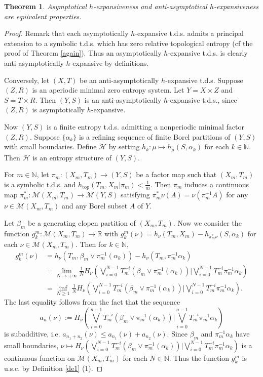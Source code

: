 \documentclass[12pt]{amsart}
\newtheorem{thm}{Theorem}[section]
\theoremstyle{definition} \theoremstyle{question}
\numberwithin{equation}{section}
\begin{document}
\begin{thm} \label{qahe}
Asymptotical $h$-expansiveness and anti-asymptotical $h$-expansiveness
are equivalent properties.
\end{thm}
\begin{proof}
Remark that each asymptotically
$h$-expansive t.d.s. admits a principal extension to a symbolic t.d.s. which has zero relative topological entropy (cf the proof of Theorem \ref{again}).
Thus
an asymptotically $h$-expansive
t.d.s. is clearly anti-asymptotically $h$-expansive by definitions.

Conversely, let $(X, T)$ be an anti-asymptotically $h$-expansive
t.d.s. Suppose $(Z,R)$ is an aperiodic minimal zero entropy system.
Let $Y=X\times Z$ and $S=T\times R$. Then $(Y,S)$ is an
anti-asymptotically $h$-expansive t.d.s., since $(Z,R)$ is
asymptotically $h$-expansive.

Now $(Y,S)$ is a finite entropy t.d.s. admitting a nonperiodic
minimal factor $(Z,R)$. Suppose $\{\alpha_k\}$ is a refining sequence of
finite Borel partitions of $(Y,S)$ with small boundaries. Define
$\mathcal{H}$ by setting $h_k :\mu\mapsto h_\mu(S,\alpha_k)$ for each $k\in {\mathbb N}$. Then
$\mathcal{H}$ is an entropy structure of $(Y,S)$.

For $m\in \mathbb{N}$, let $\pi_m: (X_m,T_m)\rightarrow (Y,S)$ be a
factor map such that $(X_m,T_m)$ is a symbolic t.d.s. and
$h_{\text{top}}(T_m, X_m|\pi_m)<\frac{1}{m}$. Then $\pi_m$ induces a
continuous map $\pi_m^*:\mathcal{M}(X_m,T_m)\rightarrow
\mathcal{M}(Y,S)$ satisfying $\pi_m^*\nu(A)=\nu(\pi^{-1}_mA)$ for
any $\nu\in \mathcal{M}(X_m,T_m)$ and  any Borel subset $A$ of $Y$.

Let $\beta_m$ be a generating clopen partition of $(X_m,T_m)$. Now
we consider the function $g^{m}_k:\mathcal{M}(X_m,T_m)\rightarrow
\mathbb{R}$ with
$g^m_{k}(\nu)=h_\nu(T_m,X_m)-h_{\pi_m^*\nu}(S,\alpha_k)$ for each $\nu\in
\mathcal{M}(X_m,T_m)$. Then for $k\in \mathbb{N}$,
\begin{align*}
g_k^m(\nu)&=h_\nu(T_m,\beta_m\vee
\pi_m^{-1}(\alpha_k))-h_{\nu}(T_m,\pi_m^{-1}\alpha_k)\\
&=\lim_{N\rightarrow +\infty}
\frac{1}{N}H_\nu(\bigvee_{i=0}^{N-1}T^{-i}_m (\beta_m\vee
\pi_m^{-1}(\alpha_k))|\bigvee_{i=0}^{N-1}T^{-i}_m\pi_m^{-1}\alpha_k)\\
&=\inf_{N\ge 1} \frac{1}{N} H_\nu(\bigvee_{i=0}^{N-1}T^{-i}_m (\beta_m\vee
\pi_m^{-1}(\alpha_k))|\bigvee_{i=0}^{N-1}T^{-i}_m\pi_m^{-1}\alpha_k).
\end{align*}
The last equality follows from the fact that the sequence
$$a_n(\nu):=H_\nu(\bigvee_{i=0}^{n-1}T^{-i}_m (\beta_m\vee
\pi_m^{-1}(\alpha_k))|\bigvee_{i=0}^{n-1}T^{-i}_m\pi_m^{-1}\alpha_k)$$
is subadditive, i.e. $a_{n_1+n_2}(\nu)\le
a_{n_1}(\nu)+a_{n_2}(\nu)$. Since $\beta_m$ and $\pi_m^{-1}\alpha_k$
have small boundaries, $\nu\mapsto H_\nu(\bigvee_{i=0}^{N-1}T^{-i}_m
(\beta_m\vee
\pi_m^{-1}(\alpha_k))|\bigvee_{i=0}^{N-1}T^{-i}_m\pi_m^{-1}\alpha_k)$
is a continuous function on $\mathcal{M}(X_m,T_m)$ for each $N\in
{\mathbb N}$. Thus the function $g_k^m$ is u.s.c. by Definition \ref{de1}
(1).


\end{proof}
\end{document}

